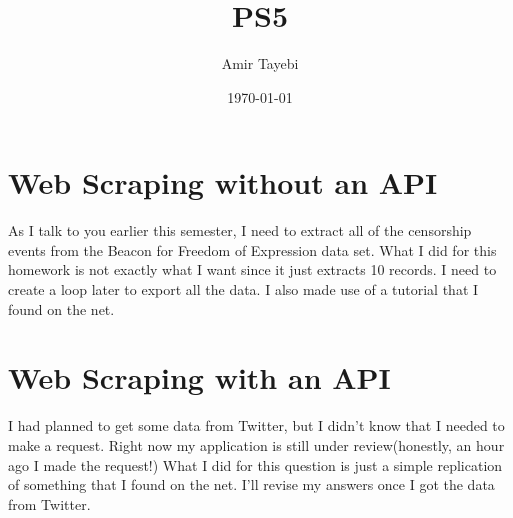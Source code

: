 \documentclass{article}
\title{PS5}
\author{Amir Tayebi}
\date{\today}
\begin{document}
\maketitle

\section{Web Scraping without an API}

As I talk to you earlier this semester, I need to extract all of the censorship events from the Beacon for Freedom of Expression data set. What I did for this homework is not exactly what I want since it just extracts 10 records. I need to create a loop later to export all the data.
I also made use of a tutorial that I found on the net.

\section{Web Scraping with an API}

I had planned to get some data from Twitter, but I didn't know that I needed to make a request. Right now my application is still under review(honestly, an hour ago I made the request!)
What I did for this question is just a simple replication of something that I found on the net. I'll revise my answers once I got the data from Twitter.
\end{document}
